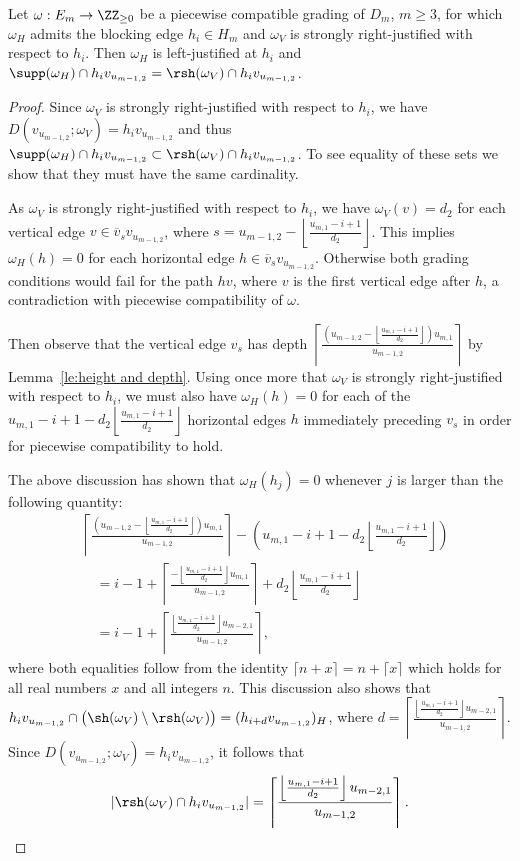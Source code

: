 \begin{proposition}
 \label{prop:strong justification implication}
 Let $\omega:E_m\to\ZZ_{\ge0}$ be a piecewise compatible grading of $D_m$, $m\ge3$, for which $\omega_H$ admits the blocking edge $h_i\in H_m$ and $\omega_V$ is strongly right-justified with respect to $h_i$.
 Then $\omega_H$ is left-justified at $h_i$ and $\supp(\omega_H)\cap h_iv_{u_{m-1,2}}=\rsh(\omega_V)\cap h_iv_{u_{m-1,2}}$.
\end{proposition}
\begin{proof}
 Since $\omega_V$ is strongly right-justified with respect to $h_i$, we have $D(v_{u_{m-1,2}};\omega_V)=h_iv_{u_{m-1,2}}$ and thus $\supp(\omega_H)\cap h_iv_{u_{m-1,2}}\subset\rsh(\omega_V)\cap h_iv_{u_{m-1,2}}$.
 To see equality of these sets we show that they must have the same cardinality.

 As $\omega_V$ is strongly right-justified with respect to $h_i$, we have $\omega_V(v)=d_2$ for each vertical edge $v\in\overline{v}_sv_{u_{m-1,2}}$, where $s=u_{m-1,2}-\left\lfloor\frac{u_{m,1}-i+1}{d_2}\right\rfloor$.
 This implies $\omega_H(h)=0$ for each horizontal edge $h\in\overline{v}_sv_{u_{m-1,2}}$.
 Otherwise both grading conditions would fail for the path $hv$, where $v$ is the first vertical edge after $h$, a contradiction with piecewise compatibility of $\omega$.

 Then observe that the vertical edge $v_s$ has depth $\left\lceil\frac{\left(u_{m-1,2}-\left\lfloor\frac{u_{m,1}-i+1}{d_2}\right\rfloor\right)u_{m,1}}{u_{m-1,2}}\right\rceil$ by Lemma~\ref{le:height and depth}.
 Using once more that $\omega_V$ is strongly right-justified with respect to $h_i$, we must also have $\omega_H(h)=0$ for each of the $u_{m,1}-i+1-d_2\left\lfloor\frac{u_{m,1}-i+1}{d_2}\right\rfloor$ horizontal edges $h$ immediately preceding $v_s$ in order for piecewise compatibility to hold.

 The above discussion has shown that $\omega_H(h_j)=0$ whenever $j$ is larger than the following quantity:
 \begin{align*}
 &\left\lceil\frac{\left(u_{m-1,2}-\left\lfloor\frac{u_{m,1}-i+1}{d_2}\right\rfloor\right)u_{m,1}}{u_{m-1,2}}\right\rceil-\left(u_{m,1}-i+1-d_2\left\lfloor\frac{u_{m,1}-i+1}{d_2}\right\rfloor\right)\\
 &\quad=i-1+\left\lceil\frac{-\left\lfloor\frac{u_{m,1}-i+1}{d_2}\right\rfloor u_{m,1}}{u_{m-1,2}}\right\rceil+d_2\left\lfloor\frac{u_{m,1}-i+1}{d_2}\right\rfloor\\
 &\quad=i-1+\left\lceil\frac{\left\lfloor\frac{u_{m,1}-i+1}{d_2}\right\rfloor u_{m-2,1}}{u_{m-1,2}}\right\rceil,
 \end{align*}
 where both equalities follow from the identity $\lceil n+x\rceil=n+\lceil x\rceil$ which holds for all real numbers $x$ and all integers $n$.
 This discussion also shows that $h_iv_{u_{m-1,2}}\cap\big(\sh(\omega_V)\setminus\rsh(\omega_V)\big)=(h_{i+d}v_{u_{m-1,2}})_H$, where $d=\left\lceil\frac{\left\lfloor\frac{u_{m,1}-i+1}{d_2}\right\rfloor u_{m-2,1}}{u_{m-1,2}}\right\rceil$. 
 Since $D(v_{u_{m-1,2}};\omega_V)=h_iv_{u_{m-1,2}}$, it follows that 
 \[|\rsh(\omega_V)\cap h_iv_{u_{m-1,2}}|=\left\lceil\frac{\left\lfloor\frac{u_{m,1}-i+1}{d_2}\right\rfloor u_{m-2,1}}{u_{m-1,2}}\right\rceil.\]


\end{proof}
